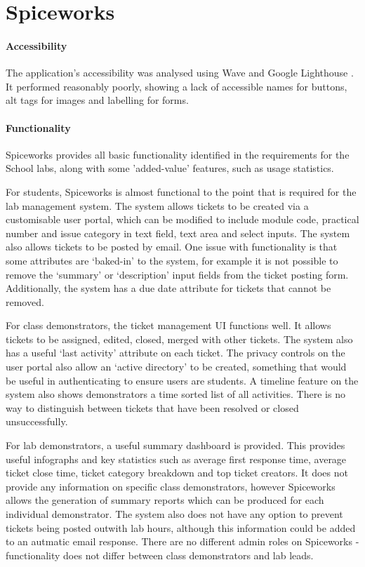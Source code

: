 \newpage
\section{Spiceworks}

\paragraph{Accessibility} The application's accessibility was analysed using Wave \cite{accesscheck} and Google Lighthouse \cite{Lighthouse}. It performed reasonably poorly, showing a lack of accessible names for buttons, alt tags for images and labelling for forms.

\paragraph{Functionality}

Spiceworks provides all basic functionality identified in the requirements for the School labs, along with some 'added-value' features, such as usage statistics.

For students, Spiceworks is almost functional to the point that is required for the lab management system. The system allows tickets to be created via a customisable user portal, which can be modified to include module code, practical number and issue category in text field, text area and select inputs. The system also allows tickets to be posted by email. One issue with functionality is that some attributes are `baked-in' to the system, for example it is not possible to remove the `summary' or `description' input fields from the ticket posting form. Additionally, the system has a due date attribute for tickets that cannot be removed.

For class demonstrators, the ticket management UI functions well. It allows tickets to be assigned, edited, closed, merged with other tickets. The system also has a useful `last activity' attribute on each ticket. The privacy controls on the user portal also allow an `active directory' to be created, something that would be useful in authenticating to ensure users are students. A timeline feature on the system also shows demonstrators a time sorted list of all activities. There is no way to distinguish between tickets that have been resolved or closed unsuccessfully. 

For lab demonstrators, a useful summary dashboard is provided. This provides useful infographs and key statistics such as average first response time, average ticket close time, ticket category breakdown and top ticket creators. It does not provide any information on specific class demonstrators, however Spiceworks allows the generation of summary reports which can be produced for each individual demonstrator. The system also does not have any option to prevent tickets being posted outwith lab hours, although this information could be added to an autmatic email response. There are no different admin roles on Spiceworks - functionality does not differ between class demonstrators and lab leads.

